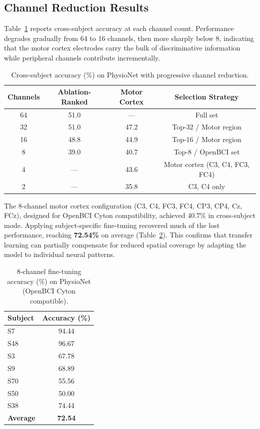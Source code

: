 \documentclass[12pt, a4paper]{article}
\begin{document}
\subsection{Channel Reduction Results}

Table~\ref{tab:channel_reduction} reports cross-subject accuracy at each channel count. Performance degrades gradually from 64 to 16 channels, then more sharply below 8, indicating that the motor cortex electrodes carry the bulk of discriminative information while peripheral channels contribute incrementally.

\begin{table}[htbp]
\centering
\caption{Cross-subject accuracy (\%) on PhysioNet with progressive channel reduction.}
\label{tab:channel_reduction}
\begin{tabular}{cccc}
\toprule
\textbf{Channels} & \textbf{Ablation-Ranked} & \textbf{Motor Cortex} & \textbf{Selection Strategy} \\
\midrule
64 & 51.0 & --- & Full set \\
32 & 51.0 & 47.2 & Top-32 / Motor region \\
16 & 48.8 & 44.9 & Top-16 / Motor region \\
8  & 39.0 & 40.7 & Top-8 / OpenBCI set \\
4  & --- & 43.6 & Motor cortex (C3, C4, FC3, FC4) \\
2  & --- & 35.8 & C3, C4 only \\
\bottomrule
\end{tabular}
\end{table}

The 8-channel motor cortex configuration (C3, C4, FC3, FC4, CP3, CP4, Cz, FCz), designed for OpenBCI Cyton compatibility, achieved 40.7\% in cross-subject mode. Applying subject-specific fine-tuning recovered much of the lost performance, reaching \textbf{72.54\%} on average (Table~\ref{tab:8ch_finetune}). This confirms that transfer learning can partially compensate for reduced spatial coverage by adapting the model to individual neural patterns.

\begin{table}[htbp]
\centering
\caption{8-channel fine-tuning accuracy (\%) on PhysioNet (OpenBCI Cyton compatible).}
\label{tab:8ch_finetune}
\begin{tabular}{lc}
\toprule
\textbf{Subject} & \textbf{Accuracy (\%)} \\
\midrule
S7  & 94.44 \\
S48 & 96.67 \\
S3  & 67.78 \\
S9  & 68.89 \\
S70 & 55.56 \\
S50 & 50.00 \\
S38 & 74.44 \\
\midrule
\textbf{Average} & \textbf{72.54} \\
\bottomrule
\end{tabular}
\end{table}
\end{document}
